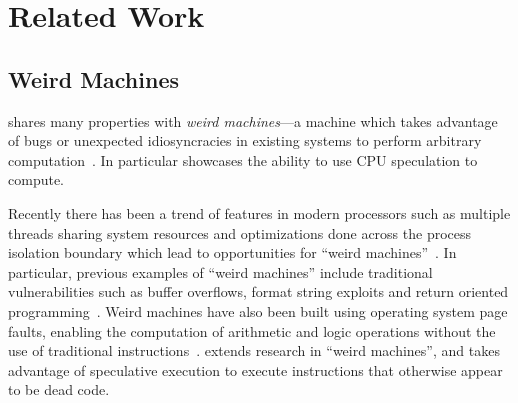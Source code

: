 \section{Related Work}
\label{sec:related-work}


\subsection{Weird Machines}

\speculake shares many properties with \textit{weird machines}---a machine which
takes advantage of bugs or unexpected idiosyncracies in existing systems to
perform arbitrary
computation~\cite{weird_machines,bratus2011exploit}. In
particular \speculake showcases the ability to use CPU speculation to compute.

Recently there has been a trend of features in modern processors such as
multiple threads sharing system resources and optimizations done across the
process isolation boundary which lead to opportunities for ``weird
machines''~\cite{d2015exploiting}. In particular, previous examples of ``weird
machines'' include traditional vulnerabilities such as buffer overflows, format
string exploits and return oriented
programming~\cite{buffer_overflow, format_string_exploit, shacham2007geometry}.
Weird machines have also been built using operating system page faults, enabling
the computation of arithmetic and logic operations without the use of
traditional instructions~\cite{bangert2013page}.
\speculake extends research in ``weird machines'', and takes advantage of
speculative execution to execute instructions that otherwise appear to be dead
code.





